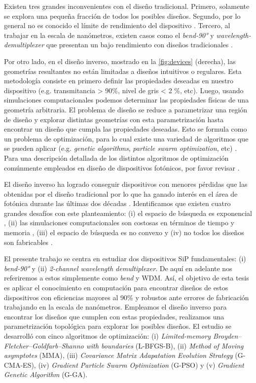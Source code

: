 Existen tres grandes inconvenientes con el diseño tradicional. 
Primero, solamente se explora una pequeña fracción de todos los posibles diseños.
Segundo, por lo general no es conocido el límite de rendimiento del dispositivo
\citep{Molesky2018}.
Tercero, al trabajar en la escala de nanómetros, existen casos como el
\emph{bend-90°} y \emph{wavelength-demultiplexer} que presentan un bajo rendimiento con diseños tradicionales \citep{Su2020}.

Por otro lado, en el diseño inverso, mostrado en la \autoref{fig:devices}
(derecha), las geometrías resultantes no están limitadas a diseños intuitivos o regulares.
Esta metodología consiste en primero definir las propiedades deseadas en nuestro dispositivo (e.g. transmitancia > 90\%, nivel de gris < 2 \%, etc).
Luego, usando simulaciones computacionales podemos determinar las propiedades físicas
de una geometría arbitraria. El problema de diseño se reduce a parametrizar una región
de diseño y explorar distintas geometrías con esta parametrización hasta encontrar un diseño
que cumpla las propiedades deseadas.
Esto se formula como un problema de optimización, para lo cual existe una variedad de algoritmos
que se pueden aplicar (e.g. \emph{genetic algorithms}, \emph{particle swarm optimization}, etc)
\citep{Molesky2018, Su2020}.
Para una descripción detallada de los distintos algoritmos de optimización
comúnmente empleados en diseño de dispositivos fotónicos, por favor revisar \cite{Schneider2019, Elsawy2020, Campbell2019}.


El diseño inverso ha logrado conseguir dispositivos con menores pérdidas que las obtenidas por el
diseño tradicional por lo que ha ganado interés en el área de fotónica durante
las últimas dos décadas \citep{Su2018, Molesky2018, Campbell2019}. 
Identificamos que existen cuatro grandes desafíos con este planteamiento:
(i) el espacio de búsqueda es exponencial \citep{Vuckovic2019}, 
(ii) las simulaciones computacionales son costosas en términos de tiempo y memoria \citep{Kudyshev2020}, 
(iii) el espacio de búsqueda es no convexo \citep{Su2018} y
(iv) no todos los diseños son fabricables \citep{Su2020}.


El presente trabajo se centra en estudiar dos dispositivos SiP
fundamentales:
(i) \emph{bend-90°} y (ii) \emph{2-channel wavelength demultiplexer}.
De aquí en adelante nos referiremos a estos simplemente como \emph{bend} y WDM.
Así, el objetivo de esta tesis es aplicar el conocimiento en computación para
encontrar diseños de estos dispositivos con eficiencias mayores al 90\%
y robustos ante errores de fabricación trabajando en la escala de nanómetros. 
Empleamos el diseño inverso para encontrar los diseños que cumplen con estas propiedades,
realizamos una parametrización topológica para explorar los posibles diseños.
El estudio se desarrolló con cinco algoritmos de optimización: (i) \emph{Limited-memory Broyden–Fletcher–Goldfarb–Shanno with boundaries} (L-BFGS-B), 
(ii) \emph{Method of Moving asymptotes} (MMA), 
(iii) \emph{Covariance Matrix Adapatation Evolution Strategy} (G-CMA-ES), (iv) \emph{Gradient Particle Swarm Optimization} (G-PSO) y (v) \emph{Gradient Genetic Algorithm} (G-GA).


